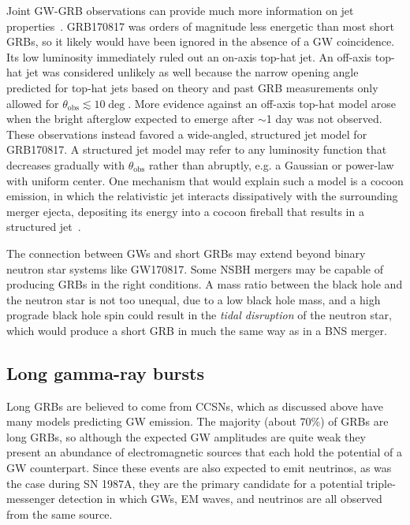 Joint GW-GRB observations can provide much more information on jet properties~\citep{Mogushi_2019, Farah_2020}.
GRB170817 was orders of magnitude less energetic than most short \acp{GRB}, so it likely would have been ignored in the absence of a \ac{GW} coincidence.
Its low luminosity immediately ruled out an on-axis top-hat jet.
An off-axis top-hat jet was considered unlikely as well because the narrow opening angle predicted for top-hat jets based on theory and past \ac{GRB} measurements only allowed for $\theta_{\mathrm{obs}} \lesssim 10\deg$.
More evidence against an off-axis top-hat model arose when the bright afterglow expected to emerge after $\sim$1 day was not observed.
These observations instead favored a wide-angled, structured jet model for GRB170817.
A structured jet model may refer to any luminosity function that decreases gradually with $\theta_{\mathrm{obs}}$ rather than abruptly, e.g. a Gaussian or power-law with uniform center.
One mechanism that would explain such a model is a cocoon emission, in which the relativistic jet interacts dissipatively with the surrounding merger ejecta, depositing its energy into a cocoon fireball that results in a structured jet~\citep{gw170817_grb}.

The connection between GWs and short GRBs may extend beyond binary neutron star systems like GW170817.
Some \ac{NSBH} mergers may be capable of producing GRBs in the right conditions.
A mass ratio between the black hole and the neutron star is not too unequal, due to a low black hole mass, and a high prograde black hole spin could result in the \textit{tidal disruption} of the neutron star, which would produce a short GRB in much the same way as in a \ac{BNS} merger.


\subsection{Long gamma-ray bursts}

Long GRBs are believed to come from \acp{CCSN}, which as discussed above have many models predicting GW emission.
The majority (about 70\%) of GRBs are long GRBs, so although the expected GW amplitudes are quite weak they present an abundance of electromagnetic sources that each hold the potential of a GW counterpart.
Since these events are also expected to emit neutrinos, as was the case during SN 1987A, they are the primary candidate for a potential triple-messenger detection in which GWs, EM waves, and neutrinos are all observed from the same source.

